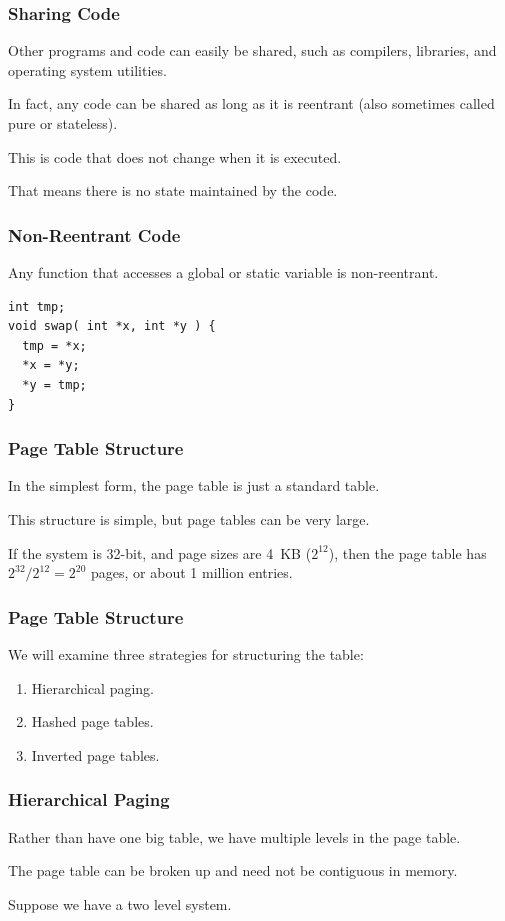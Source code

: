 \begin{frame}
\frametitle{Sharing Code}

Other programs and code can easily be shared, such as compilers, libraries, and operating system utilities. 

In fact, any code can be shared as long as it is \alert{reentrant} (also sometimes called pure or stateless). 

This is code that does not change when it is executed. 

That means there is no state maintained by the code. 


\end{frame}

\begin{frame}[fragile]
\frametitle{Non-Reentrant Code}

Any function that accesses a global or static variable is non-reentrant.

\begin{verbatim}
int tmp;
void swap( int *x, int *y ) {
  tmp = *x;
  *x = *y;
  *y = tmp; 
}
\end{verbatim}

\end{frame}

\begin{frame}
\frametitle{Page Table Structure}

In the simplest form, the page table is just a standard table. 

This structure is simple, but page tables can be very large.

If the system is 32-bit, and page sizes are 4~KB ($2^{12}$), then the page table has $2^{32}/2^{12} = 2^{20}$ pages, or about 1 million entries.

\end{frame}

\begin{frame}
\frametitle{Page Table Structure}

We will examine three strategies for structuring the table:

\begin{enumerate}
	\item Hierarchical paging.
	\item Hashed page tables.
	\item Inverted page tables.
\end{enumerate}

\end{frame}

\begin{frame}
\frametitle{Hierarchical Paging}

Rather than have one big table, we have multiple levels in the page table. 

The page table can be broken up and need not be contiguous in memory. 

Suppose we have a two level system. 

\end{frame}

